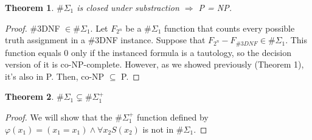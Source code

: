 \documentclass[12pt]{article}
\newtheorem{theo}{Theorem}
\begin{document}
\begin{theo}
$\#\Sigma_1$ is closed under substraction $\Rightarrow$ P = NP.
\end{theo}
\begin{proof}
\#3DNF $\in \#\Sigma_1$. Let $F_{2^n}$ be a $\#\Sigma_1$ function that counts every possible truth assignment in a \#3DNF instance. Suppose that $F_{2^n}-F_{\#3DNF} \in \#\Sigma_1$. This function equals 0 only if the instanced formula is a tautology, so the decision version of it is co-NP-complete. However, as we showed previously (Theorem 1), it's also in P. Then, co-NP $\subseteq$ P.
\end{proof}

\begin{theo}
$\#\Sigma_1 \subsetneq \#\Sigma_1^{+}$
\end{theo}
\begin{proof}
We will show that the $\#\Sigma_1^{+}$ function defined by $\varphi(x_1) = (x_1 = x_1) \wedge \forall x_2 S(x_2)$ is not in $\#\Sigma_1$.
\end{proof}

\end{document}
